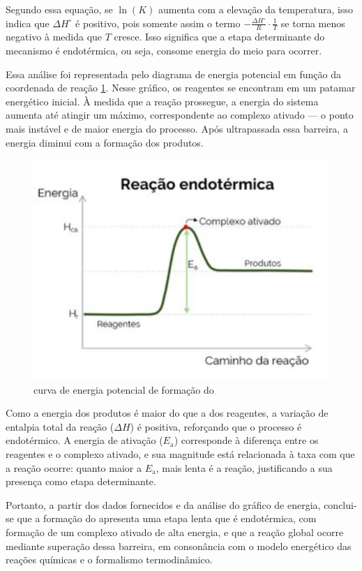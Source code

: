 Segundo essa equação, se \(\ln(K)\) aumenta com a elevação da temperatura, isso indica que \(\Delta H^\circ\) é positivo, pois somente assim o termo \(-\frac{\Delta H^\circ}{R} \cdot \frac{1}{T}\) se torna menos negativo à medida que \(T\) cresce. Isso significa que a etapa determinante do mecanismo é endotérmica, ou seja, consome energia do meio para ocorrer.

Essa análise foi representada pelo diagrama de energia potencial em função da coordenada de reação \cref{diagrama}. Nesse gráfico, os reagentes se encontram em um patamar energético inicial. À medida que a reação prossegue, a energia do sistema aumenta até atingir um máximo, correspondente ao complexo ativado — o ponto mais instável e de maior energia do processo. Após ultrapassada essa barreira, a energia diminui com a formação dos produtos.

    \begin{figure}[H]
        \centering
        \includegraphics[width=0.35\linewidth]{fig/grafico.png}
        \caption{curva de energia potencial de formação do }
        \label{diagrama}
    \end{figure}

Como a energia dos produtos é maior do que a dos reagentes, a variação de entalpia total da reação (\(\Delta H\)) é positiva, reforçando que o processo é endotérmico. A energia de ativação (\(E_\text{a}\)) corresponde à diferença entre os reagentes e o complexo ativado, e sua magnitude está relacionada à taxa com que a reação ocorre: quanto maior a \(E_\text{a}\), mais lenta é a reação, justificando a sua presença como etapa determinante.

Portanto, a partir dos dados fornecidos e da análise do gráfico de energia, conclui-se que a formação do  apresenta uma etapa lenta que é endotérmica, com formação de um complexo ativado de alta energia, e que a reação global ocorre mediante superação dessa barreira, em consonância com o modelo energético das reações químicas e o formalismo termodinâmico.
